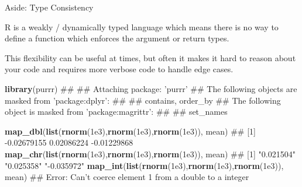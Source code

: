 \documentclass[11pt,ignorenonframetext,]{beamer}
\newenvironment{Shaded}{}{}
\newcommand{\KeywordTok}[1]{\textcolor[rgb]{0.00,0.44,0.13}{\textbf{{#1}}}}
\newcommand{\FloatTok}[1]{\textcolor[rgb]{0.25,0.63,0.44}{{#1}}}
\newcommand{\NormalTok}[1]{{#1}}
\let\oldShaded\Shaded
\let\endoldShaded\endShaded
\renewenvironment{Shaded}{\footnotesize\begin{spacing}{0.9}\oldShaded}{\endoldShaded\end{spacing}}
\begin{document}
\begin{frame}[fragile]{Aside: Type Consistency}

R is a weakly / dynamically typed language which means there is no way
to define a function which enforces the argument or return types.

This flexibility can be useful at times, but often it makes it hard to
reason about your code and requires more verbose code to handle edge
cases.

\begin{Shaded}
\begin{Highlighting}[]
\KeywordTok{library}\NormalTok{(purrr)}
\NormalTok{## }
\NormalTok{## Attaching package: 'purrr'}
\NormalTok{## The following objects are masked from 'package:dplyr':}
\NormalTok{## }
\NormalTok{##     contains, order_by}
\NormalTok{## The following object is masked from 'package:magrittr':}
\NormalTok{## }
\NormalTok{##     set_names}

\KeywordTok{map_dbl}\NormalTok{(}\KeywordTok{list}\NormalTok{(}\KeywordTok{rnorm}\NormalTok{(}\FloatTok{1e3}\NormalTok{),}\KeywordTok{rnorm}\NormalTok{(}\FloatTok{1e3}\NormalTok{),}\KeywordTok{rnorm}\NormalTok{(}\FloatTok{1e3}\NormalTok{)), mean)}
\NormalTok{## [1] -0.02679155  0.02086224 -0.01229868}
\KeywordTok{map_chr}\NormalTok{(}\KeywordTok{list}\NormalTok{(}\KeywordTok{rnorm}\NormalTok{(}\FloatTok{1e3}\NormalTok{),}\KeywordTok{rnorm}\NormalTok{(}\FloatTok{1e3}\NormalTok{),}\KeywordTok{rnorm}\NormalTok{(}\FloatTok{1e3}\NormalTok{)), mean)}
\NormalTok{## [1] "0.021504"  "0.025358"  "-0.035972"}
\KeywordTok{map_int}\NormalTok{(}\KeywordTok{list}\NormalTok{(}\KeywordTok{rnorm}\NormalTok{(}\FloatTok{1e3}\NormalTok{),}\KeywordTok{rnorm}\NormalTok{(}\FloatTok{1e3}\NormalTok{),}\KeywordTok{rnorm}\NormalTok{(}\FloatTok{1e3}\NormalTok{)), mean)}
\NormalTok{## Error: Can't coerce element 1 from a double to a integer}
\end{Highlighting}
\end{Shaded}

\end{frame}
\end{document}
